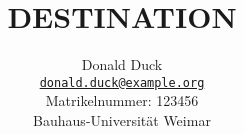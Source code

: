 \documentclass[a5paper]{book}
\theoremstyle{definition}
\theoremstyle{remark}
\begin{document}

\title{\textbf{%
    {{DESTINATION}}
}}
\author{Donald Duck\\
  \normalsize \href{mailto:donald.duck@example.org}
    {\nolinkurl{donald.duck@example.org}} \\
  \normalsize Matrikelnummer: 123456\\
  \vspace{3mm}
  \normalsize Bauhaus-Universit\"at Weimar\\
}

\maketitle

\tableofcontents




\end{document}
